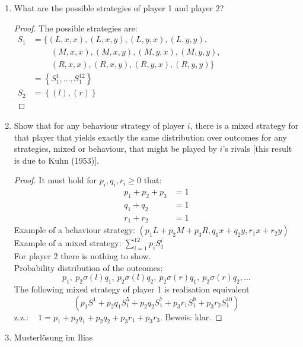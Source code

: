 \documentclass[12pt]{extreport} %
\theoremstyle{named}
\theoremstyle{itshape}
\theoremstyle{normal}
\begin{document}
\begin{enumerate}
	\item What are the possible strategies of player 1 and player 2?
		\begin{proof}
			The possible strategies are:
	  		\begin{align*}
 				S_{1} & = \big\{ (L, x, x), (L, x, y), (L, y, x), (L, y, y), ~\hspace{7cm} \\
 			  		& ~\qquad (M, x, x), (M, x, y), (M, y, x), (M, y, y), \\
 			  		& ~\qquad (R, x, x), (R, x, y), (R, y, x), (R, y, y) \big\} \\
 			  		& = \left\{ S_{1}^{1}, \dotsc, S_{1}^{12} \right\} \\
 				S_{2} & = \left\{ (l), (r) \right\}
 	  		\end{align*}
 	  	\end{proof}
	\item Show that for any behaviour strategy of player $i$, there is a mixed strategy for that player that yields exactly the same distribution over outcomes for any strategies, mixed or behaviour, that might be played by $i$'s rivals [this result is due to Kuhn (1953)].
		\begin{proof}
		  It must hold for $p_i, q_i, r_i \geq 0$ that:
		  \begin{align*}
			p_{1} + p_{2} + p_{3} & = 1 \\
			q_{1} + q_{2} & = 1 \\
			r_{1} + r_{2} & = 1
		  \end{align*}
		  Example of a behaviour strategy: $(p_{1}L + p_{2}M + p_{3}R, q_{1} x + q_{2}y, r_{1}x + r_{2} y)$ \\
		  Example of a mixed strategy: $\sum_{i=1}^{12} p_{i} S_{1}^{i}$ \\
		  For player 2 there is nothing to show. \\ 
		
		  Probability distribution of the outcomes:
		  $$ p_{1}, ~ p_{2} \sigma(l) q_{1}, ~ p_{2} \sigma(l) q_{2}, ~ p_{2} \sigma(r) q_{1}, ~ p_{2} \sigma(r) q_{2}, \dotsc $$
		  The following mixed strategy of player 1 is realisation equivalent
		  $$ \left( p_{1} S^{1} + p_{2} q_{1} S_{1}^{5} + p_{2} q_{2} S_{1}^{7} + p_{3} r_{1} S_{1}^{9} + p_{3} r_{2} S_{1}^{10} \right) $$
		  z.z.: ~ $ 1 = p_{1} + p_{2} q_{1} + p_{2} q_{2} + p_{3} r_{1} + p_{3} r_{3}$. Beweis: klar.
		\end{proof}
	\item Musterlösung im Ilias
\end{enumerate} ~\\
\end{document}
